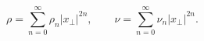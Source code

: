 \begin{equation}\label{series}
\rho=\sum_{n=0}^\infty\rho_n|x_\perp|^{2n},~~~~~~~~~
\nu=\sum_{n=0}^\infty\nu_n|x_\perp|^{2n}.\end{equation}

